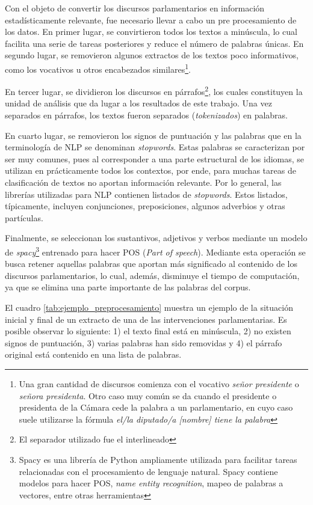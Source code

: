 \documentclass[
  12pt,
]{article}
\begin{document}
Con el objeto de convertir los discursos parlamentarios en información
estadísticamente relevante, fue necesario llevar a cabo un pre
procesamiento de los datos. En primer lugar, se convirtieron todos los
textos a minúscula, lo cual facilita una serie de tareas posteriores y
reduce el número de palabras únicas. En segundo lugar, se removieron
algunos extractos de los textos poco informativos, como los vocativos u
otros encabezados
similares\footnote{Una gran cantidad de discursos comienza con el vocativo  \textit{señor presidente} o \textit{señora presidenta}. Otro caso muy común se da cuando el presidente o presidenta de la Cámara cede la palabra a un parlamentario, en cuyo caso suele utilizarse la fórmula \textit{el/la diputado/a [nombre] tiene la palabra}}.

En tercer lugar, se dividieron los discursos en
párrafos\footnote{El separador utilizado fue el interlineado}, los
cuales constituyen la unidad de análisis que da lugar a los resultados
de este trabajo. Una vez separados en párrafos, los textos fueron
separados (\emph{tokenizados}) en palabras.

En cuarto lugar, se removieron los signos de puntuación y las palabras
que en la terminología de NLP se denominan \emph{stopwords}. Estas
palabras se caracterizan por ser muy comunes, pues al corresponder a una
parte estructural de los idiomas, se utilizan en prácticamente todos los
contextos, por ende, para muchas tareas de clasificación de textos no
aportan información relevante. Por lo general, las librerías utilizadas
para NLP contienen listados de \emph{stopwords}. Estos listados,
típicamente, incluyen conjunciones, preposiciones, algunos adverbios y
otras partículas.

Finalmente, se seleccionan los sustantivos, adjetivos y verbos mediante
un modelo de
\emph{spacy}\footnote{Spacy es una librería de Python ampliamente utilizada para facilitar tareas relacionadas con el procesamiento de lenguaje natural. Spacy contiene modelos para hacer POS, \textit{name entity recognition}, mapeo de palabras a vectores, entre otras herramientas}
entrenado para hacer POS (\emph{Part of speech}). Mediante esta
operación se busca retener aquellas palabras que aportan más significado
al contenido de los discursos parlamentarios, lo cual, además, disminuye
el tiempo de computación, ya que se elimina una parte importante de las
palabras del corpus.

El cuadro \ref{tab:ejemplo_preprocesamiento} muestra un ejemplo de la
situación inicial y final de un extracto de una de las intervenciones
parlamentarias. Es posible observar lo siguiente: 1) el texto final está
en minúscula, 2) no existen signos de puntuación, 3) varias palabras han
sido removidas y 4) el párrafo original está contenido en una lista de
palabras.
\end{document}
